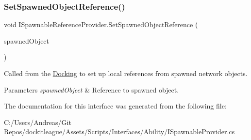 \subsubsection{\texorpdfstring{Set\+Spawned\+Object\+Reference()}{SetSpawnedObjectReference()}}
{\footnotesize\ttfamily void I\+Spawnable\+Reference\+Provider.\+Set\+Spawned\+Object\+Reference (\begin{DoxyParamCaption}\item[{Game\+Object}]{spawned\+Object }\end{DoxyParamCaption})}



Called from the \hyperlink{class_docking}{Docking} to set up local references from spawned network objects. 


\begin{DoxyParams}{Parameters}
{\em spawned\+Object} & Reference to spawned object.\\
\hline
\end{DoxyParams}


The documentation for this interface was generated from the following file\+:\begin{DoxyCompactItemize}
\item 
C\+:/\+Users/\+Andreas/\+Git Repos/dockitleague/\+Assets/\+Scripts/\+Interfaces/\+Ability/I\+Spawnable\+Provider.\+cs\end{DoxyCompactItemize}

